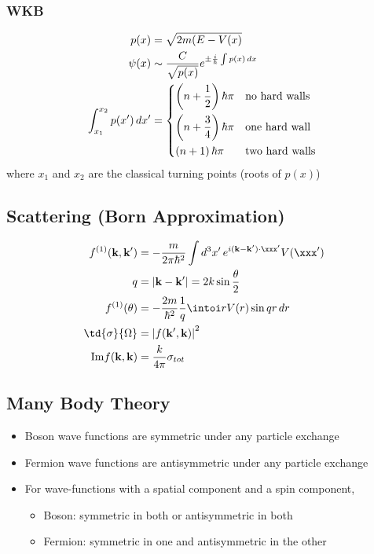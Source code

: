 \documentclass[11pt]{article}
\begin{document}
\subsubsection{WKB}
\label{sec:orge2304e7}
\begin{align*}
p(x) & = \sqrt{2m(E - V(x)} \\
\psi(x) & \sim \frac{C}{\sqrt{p(x)}} e^{\pm \frac{i}{\hbar} \int p(x) \, dx} \\
\int_{x_1}^{x_2} p(x') \, dx' & = \begin{dcases*}
                                        \left( n + \frac{1}{2} \right) \hbar \pi & no hard walls \\
                                        \left( n + \frac{3}{4} \right) \hbar \pi & one hard wall \\
                                        \left( n + 1 \right)           \hbar \pi & two hard walls \\
                                  \end{dcases*}
\end{align*}
where \(x_1\) and \(x_2\) are the classical turning points (roots of \(p(x)\))

\subsection{Scattering (Born Approximation)}
\label{sec:orga7d2fae}
\begin{align*}
f^{(1)}(\mathbf{k}, \mathbf{k}') & = -\frac{m}{2\pi \hbar^2} \int d^3 x' \, e^{i(\mathbf{k} - \mathbf{k}') \cdot \xxx'} V(\xxx') \\
q & = \left| \mathbf{k} - \mathbf{k}' \right| = 2k \sin \frac{\theta}{2} \\
f^{(1)}(\theta) & = -\frac{2m}{\hbar^2} \frac{1}{q} \intoi r V(r) \sin qr \, dr \\
\td{\sigma}{\Omega} & = \left| f(\mathbf{k}', \mathbf{k}) \right|^2 \\
\mathrm{Im} f(\mathbf{k}, \mathbf{k}) & = \frac{k}{4\pi} \sigma_{tot}
\end{align*}

\subsection{Many Body Theory}
\label{sec:org1a952ed}
\begin{itemize}
\item Boson wave functions are symmetric under any particle exchange
\item Fermion wave functions are antisymmetric under any particle exchange
\item For wave-functions with a spatial component and a spin component,
\begin{itemize}
\item Boson: symmetric in both or antisymmetric in both
\item Fermion: symmetric in one and antisymmetric in the other
\end{itemize}
\end{itemize}
\end{document}
